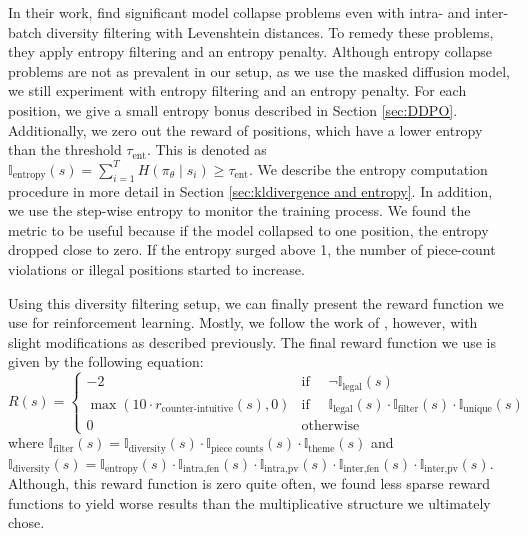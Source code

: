 In their work, \citeauthor{feng2025generatingcreativechesspuzzles} \cite{feng2025generatingcreativechesspuzzles} find significant model collapse problems even with intra- and inter-batch diversity filtering with Levenshtein distances. To remedy these problems, they apply entropy filtering and an entropy penalty. Although entropy collapse problems are not as prevalent in our setup, as we use the masked diffusion model, we still experiment with entropy filtering and an entropy penalty. For each position, we give a small entropy bonus described in Section \ref{sec:DDPO}. Additionally, we zero out the reward of positions, which have a lower entropy than the threshold $\tau_{\text{ent}}$. This is denoted as $\mathbb{I}_{\text{entropy}}(s) = \sum_{i=1}^{T} H(\pi_\theta \mid s_i) \ge \tau_{\text{ent}}$. We describe the entropy computation procedure in more detail in Section \ref{sec:kldivergence and entropy}. In addition, we use the step-wise entropy to monitor the training process. We found the metric to be useful because if the model collapsed to one position, the entropy dropped close to zero. If the entropy surged above 1, the number of piece-count violations or illegal positions started to increase.

Using this diversity filtering setup, we can finally present the reward function we use for reinforcement learning. Mostly, we follow the work of \citeauthor{feng2025generatingcreativechesspuzzles} \cite{feng2025generatingcreativechesspuzzles}, however, with slight modifications as described previously. The final reward function we use is given by the following equation:
\begin{equation}
    R(s) = \begin{cases}
        -2 & \text{if } \quad\neg\mathbb{I}_{\text{legal}}(s) \\
        \max(10\cdot r_{\text{counter-intuitive}}(s), 0) & \text{if } \quad\mathbb{I}_{\text{legal}}(s) \cdot \mathbb{I}_{\text{filter}}(s) \cdot \mathbb{I}_{\text{unique}}(s)\\
        0 & \text{otherwise}
    \end{cases}
    \label{eq:reward function}
\end{equation}
where $\mathbb{I}_{\text{filter}}(s) = \mathbb{I}_{\text{diversity}}(s) \cdot \mathbb{I}_{\text{piece counts}}(s) \cdot \mathbb{I}_{\text{theme}}(s)$ and $\mathbb{I}_{\text{diversity}}(s) = \mathbb{I}_{\text{entropy}}(s) \cdot \mathbb{I}_{\text{intra}, \text{fen}}(s) \cdot \mathbb{I}_{\text{intra}, \text{pv}}(s) \cdot \mathbb{I}_{\text{inter}, \text{fen}}(s) \cdot \mathbb{I}_{\text{inter}, \text{pv}}(s)$. Although, this reward function is zero quite often, we found less sparse reward functions to yield worse results than the multiplicative structure we ultimately chose.


